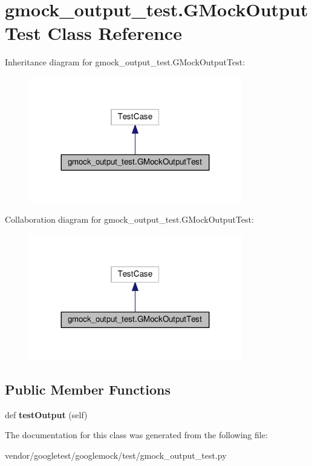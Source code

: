 \hypertarget{classgmock__output__test_1_1GMockOutputTest}{}\section{gmock\+\_\+output\+\_\+test.\+G\+Mock\+Output\+Test Class Reference}
\label{classgmock__output__test_1_1GMockOutputTest}


Inheritance diagram for gmock\+\_\+output\+\_\+test.\+G\+Mock\+Output\+Test\+:\nopagebreak
\begin{figure}[H]
\begin{center}
\leavevmode
\includegraphics[width=263pt]{classgmock__output__test_1_1GMockOutputTest__inherit__graph}
\end{center}
\end{figure}


Collaboration diagram for gmock\+\_\+output\+\_\+test.\+G\+Mock\+Output\+Test\+:\nopagebreak
\begin{figure}[H]
\begin{center}
\leavevmode
\includegraphics[width=263pt]{classgmock__output__test_1_1GMockOutputTest__coll__graph}
\end{center}
\end{figure}
\subsection*{Public Member Functions}
\begin{DoxyCompactItemize}
\item 
def {\bfseries test\+Output} (self)\hypertarget{classgmock__output__test_1_1GMockOutputTest_a661e7846690f48328fd9e0834fde9980}{}\label{classgmock__output__test_1_1GMockOutputTest_a661e7846690f48328fd9e0834fde9980}

\end{DoxyCompactItemize}


The documentation for this class was generated from the following file\+:\begin{DoxyCompactItemize}
\item 
vendor/googletest/googlemock/test/gmock\+\_\+output\+\_\+test.\+py\end{DoxyCompactItemize}
